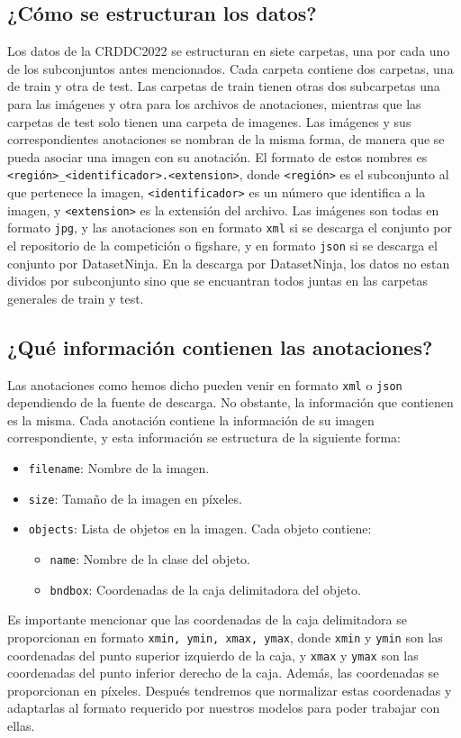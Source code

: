 \subsection{¿Cómo se estructuran los datos?}
Los datos de la CRDDC2022 se estructuran en siete carpetas, una por cada uno de los subconjuntos antes mencionados. Cada carpeta contiene dos carpetas, una de train y otra de test. Las carpetas de train tienen otras dos subcarpetas una para las imágenes y otra para los archivos de anotaciones, mientras que las carpetas de test solo tienen una carpeta de imagenes. Las imágenes y sus correspondientes anotaciones se nombran de la misma forma, de manera que se pueda asociar una imagen con su anotación. El formato de estos nombres es \texttt{<región>\_<identificador>.<extension>}, donde \texttt{<región>} es el subconjunto al que pertenece la imagen, \texttt{<identificador>} es un número que identifica a la imagen, y \texttt{<extension>} es la extensión del archivo. Las imágenes son todas en formato \texttt{jpg}, y las anotaciones son en formato \texttt{xml} si se descarga el conjunto por el repositorio de la competición o figshare, y en formato \texttt{json} si se descarga el conjunto por DatasetNinja. En la descarga por DatasetNinja, los datos no estan dividos por subconjunto sino que se encuantran todos juntas en las carpetas generales de train y test.

\subsection{¿Qué información contienen las anotaciones?}
Las anotaciones como hemos dicho pueden venir en formato \texttt{xml} o \texttt{json} dependiendo de la fuente de descarga. No obstante, la información que contienen es la misma. Cada anotación contiene la información de su imagen correspondiente, y esta información se estructura de la siguiente forma:
\begin{itemize}
    \item \texttt{filename}: Nombre de la imagen.
    \item \texttt{size}: Tamaño de la imagen en píxeles.
    \item \texttt{objects}: Lista de objetos en la imagen. Cada objeto contiene:
    \begin{itemize}
        \item \texttt{name}: Nombre de la clase del objeto.
        \item \texttt{bndbox}: Coordenadas de la caja delimitadora del objeto.
    \end{itemize}
\end{itemize}
Es importante mencionar que las coordenadas de la caja delimitadora se proporcionan en formato \texttt{xmin, ymin, xmax, ymax}, donde \texttt{xmin} y \texttt{ymin} son las coordenadas del punto superior izquierdo de la caja, y \texttt{xmax} y \texttt{ymax} son las coordenadas del punto inferior derecho de la caja. Además, las coordenadas se proporcionan en píxeles. Después tendremos que normalizar estas coordenadas y adaptarlas al formato requerido por nuestros modelos para poder trabajar con ellas.

